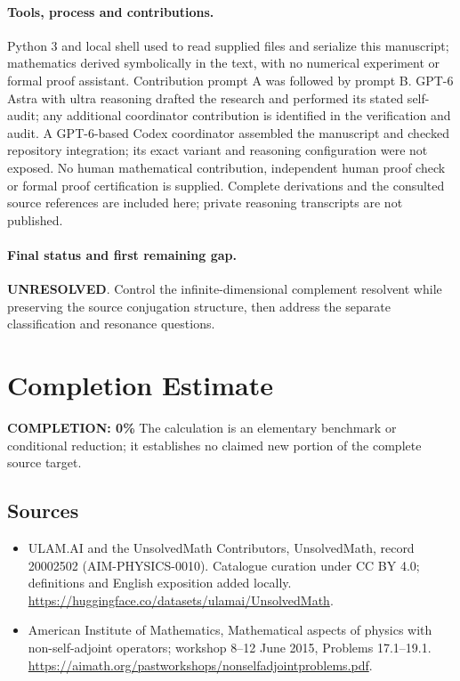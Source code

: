 \documentclass[11pt]{article}
\begin{document}
\paragraph{Tools, process and contributions.}
Python 3 and local shell used to read supplied files and serialize this manuscript; mathematics derived symbolically in the text, with no numerical experiment or formal proof assistant. Contribution prompt A was followed by prompt B. GPT-6 Astra with ultra reasoning drafted the research and performed its stated self-audit; any additional coordinator contribution is identified in the verification and audit. A GPT-6-based Codex coordinator assembled the manuscript and checked repository integration; its exact variant and reasoning configuration were not exposed. No human mathematical contribution, independent human proof check or formal proof certification is supplied. Complete derivations and the consulted source references are included here; private reasoning transcripts are not published.

\paragraph{Final status and first remaining gap.}
\textbf{UNRESOLVED}. Control the infinite-dimensional complement resolvent while preserving the source conjugation structure, then address the separate classification and resonance questions.

\section{Completion Estimate}
\noindent\textbf{COMPLETION: 0\%}
The calculation is an elementary benchmark or conditional reduction; it establishes no claimed new portion of the complete source target.

\subsection{Sources}
\begin{itemize}
\item[\hypertarget{source:20002502:1}{S1}] ULAM.AI and the UnsolvedMath Contributors, UnsolvedMath, record 20002502 (AIM-PHYSICS-0010). Catalogue curation under CC BY 4.0; definitions and English exposition added locally.
\url{https://huggingface.co/datasets/ulamai/UnsolvedMath}.
\item[\hypertarget{source:20002502:2}{S2}] American Institute of Mathematics, Mathematical aspects of physics with non-self-adjoint operators; workshop 8–12 June 2015, Problems 17.1–19.1.
\url{https://aimath.org/pastworkshops/nonselfadjointproblems.pdf}.
\end{itemize}
\label{end:20002502}
\end{document}
